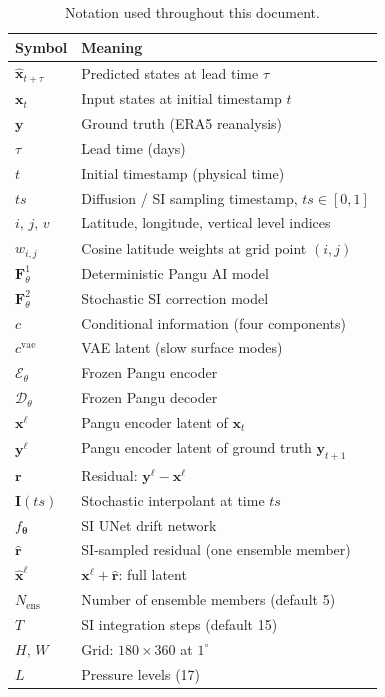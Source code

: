 \documentclass[11pt]{article}
\begin{document}
\begin{table}[h]
\centering
\renewcommand{\arraystretch}{1.25}
\begin{tabular}{ll}
\toprule
\textbf{Symbol} & \textbf{Meaning} \\
\midrule
$\hat{\mathbf{x}}_{t+\tau}$     & Predicted states at lead time $\tau$ \\
$\mathbf{x}_t$                  & Input states at initial timestamp $t$ \\
$\mathbf{y}$                    & Ground truth (ERA5 reanalysis) \\
$\tau$                          & Lead time (days) \\
$t$                             & Initial timestamp (physical time) \\
$ts$                            & Diffusion / SI sampling timestamp, $ts\in[0,1]$ \\
$i,\,j,\,v$                     & Latitude, longitude, vertical level indices \\
$w_{i,j}$                       & Cosine latitude weights at grid point $(i,j)$ \\
$\mathbf{F}^1_\theta$           & Deterministic Pangu AI model \\
$\mathbf{F}^2_\theta$           & Stochastic SI correction model \\
$c$                             & Conditional information (four components) \\
$c^{\mathrm{vae}}$              & VAE latent (slow surface modes) \\
$\mathcal{E}_\theta$            & Frozen Pangu encoder \\
$\mathcal{D}_\theta$            & Frozen Pangu decoder \\
$\mathbf{x}^{\ell}$            & Pangu encoder latent of $\mathbf{x}_t$ \\
$\mathbf{y}^{\ell}$            & Pangu encoder latent of ground truth $\mathbf{y}_{t+1}$ \\
$\mathbf{r}$                    & Residual: $\mathbf{y}^{\ell} - \mathbf{x}^{\ell}$ \\
$\mathbf{I}(ts)$                & Stochastic interpolant at time $ts$ \\
$f_{\bm{\theta}}$               & SI UNet drift network \\
$\hat{\mathbf{r}}$              & SI-sampled residual (one ensemble member) \\
$\hat{\mathbf{x}}^{\ell}$      & $\mathbf{x}^{\ell} + \hat{\mathbf{r}}$: full latent \\
$N_{\mathrm{ens}}$              & Number of ensemble members (default 5) \\
$T$                             & SI integration steps (default 15) \\
$H,\,W$                         & Grid: $180\times360$ at $1^\circ$ \\
$L$                             & Pressure levels (17) \\
\bottomrule
\end{tabular}
\caption{Notation used throughout this document.}
\end{table}
\end{document}
